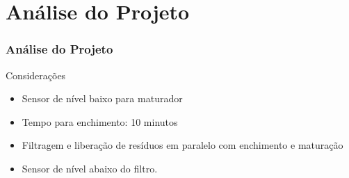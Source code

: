 \documentclass{beamer}
\begin{document}
\section{Análise do Projeto}
\begin{frame}
\frametitle{Análise do Projeto}
	\begin{block}{Considerações}
		\begin{itemize}
		\item Sensor de nível baixo para maturador
		\item Tempo para enchimento: 10 minutos
		\item Filtragem e liberação de resíduos em paralelo com enchimento e maturação
		\item Sensor de nível abaixo do filtro.
		\end{itemize}
	\end{block}
\end{frame}
\end{document}
